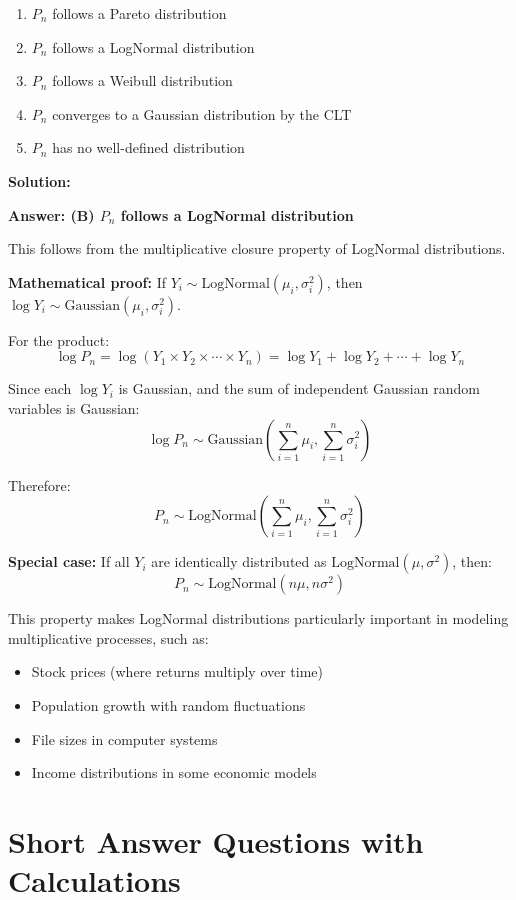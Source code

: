 \documentclass[11pt]{article}
\newenvironment{solution}
{\color{solutioncolor}\begin{framed}\textbf{Solution:}\par}
{\end{framed}}
\begin{document}
\begin{enumerate}[label=(\Alph*)]
\item $P_n$ follows a Pareto distribution
\item $P_n$ follows a LogNormal distribution  
\item $P_n$ follows a Weibull distribution
\item $P_n$ converges to a Gaussian distribution by the CLT
\item $P_n$ has no well-defined distribution
\end{enumerate}

\begin{solution}
\textbf{Answer: (B) $P_n$ follows a LogNormal distribution}

This follows from the multiplicative closure property of LogNormal distributions.

\textbf{Mathematical proof:}
If $Y_i \sim \text{LogNormal}(\mu_i, \sigma_i^2)$, then $\log Y_i \sim \text{Gaussian}(\mu_i, \sigma_i^2)$.

For the product:
$$\log P_n = \log(Y_1 \times Y_2 \times \cdots \times Y_n) = \log Y_1 + \log Y_2 + \cdots + \log Y_n$$

Since each $\log Y_i$ is Gaussian, and the sum of independent Gaussian random variables is Gaussian:
$$\log P_n \sim \text{Gaussian}\left(\sum_{i=1}^n \mu_i, \sum_{i=1}^n \sigma_i^2\right)$$

Therefore:
$$P_n \sim \text{LogNormal}\left(\sum_{i=1}^n \mu_i, \sum_{i=1}^n \sigma_i^2\right)$$

\textbf{Special case:} If all $Y_i$ are identically distributed as $\text{LogNormal}(\mu, \sigma^2)$, then:
$$P_n \sim \text{LogNormal}(n\mu, n\sigma^2)$$

This property makes LogNormal distributions particularly important in modeling multiplicative processes, such as:
\begin{itemize}
\item Stock prices (where returns multiply over time)
\item Population growth with random fluctuations
\item File sizes in computer systems
\item Income distributions in some economic models
\end{itemize}
\end{solution}

\section{Short Answer Questions with Calculations}
\end{document}
